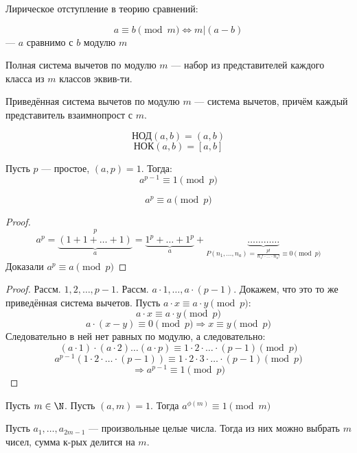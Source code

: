 Лирическое отступление в теорию сравнений:
\begin{definition}
\[
a \equiv b \pmod{m} \iff m | (a - b)
\]
--- $a$ сравнимо с $b$ модулю $m$
\end{definition}
\begin{definition}
Полная система вычетов по модулю $m$ --- набор из представителей каждого класса из $m$ классов эквив-ти.
\end{definition}
\begin{definition}
Приведённая система вычетов по модулю $m$ --- система вычетов, причём каждый представитель взаимнопрост с $m$.
\end{definition}
\begin{symb}
\[
\text{НОД}(a, b) = (a, b)
\]
\[
  \text{НОК}(a, b) = [a, b]
\]
\end{symb}
\begin{theorem}
\label{th:mlt_14}
Пусть $p$ --- простое, $(a, p) = 1$. Тогда:
\[
a^{p - 1} \equiv 1 \pmod p
\]
\end{theorem}
\begin{consequence}
\[
a^{p} \equiv a \pmod p
\]
\end{consequence}
\begin{proof}
\[
  a^{p} = \underbrace{(1 + 1 + \ldots + 1)}_{a}^{p} = \underbrace{1^{p} + \ldots + 1^{p}}_{a} + \underbrace{\ldots\ldots\ldots\ldots}_{P(n_1, \ldots, n_a) = \frac{p!}{n_1! \cdot \ldots \cdot n_a!} \equiv 0 \pmod p}
\]
Доказали $a^{p} \equiv a \pmod p$
\end{proof}
\begin{proof}
Рассм. $1, 2, \ldots, p - 1$. Рассм. $a \cdot 1, \ldots, a \cdot (p - 1)$. Докажем, что это то же приведённая система вычетов. Пусть $a \cdot x \equiv a \cdot y \pmod p$:
\[
a \cdot x \equiv a \cdot y \pmod p
\]
\[
  a \cdot (x - y) \equiv 0 \pmod p \Rightarrow x \equiv y \pmod p
\]
Следовательно в ней нет равных по модулю, а следовательно:
\[
  (a \cdot 1) \cdot (a \cdot 2) \ldots (a \cdot p) \equiv 1 \cdot 2 \cdot \ldots \cdot (p - 1) \pmod p
\]
\[
  a^{p - 1} (1 \cdot 2 \cdot \ldots \cdot (p - 1)) \equiv 1 \cdot 2 \cdot 3 \cdot \ldots \cdot (p - 1) \pmod p
\]
\[
\Rightarrow a^{p - 1} \equiv 1 \pmod p
\]
\end{proof}
\begin{theorem}[Эйлера]
\label{th:euler_14}
Пусть $m \in \N$. Пусть $(a, m) = 1$. Тогда $a^{\phi(m)} \equiv 1 \pmod m$
\end{theorem}
\begin{theorem}
\label{th:erdesh-ginsburg-ziva-14}
Пусть $a_1, \ldots, a_{2m - 1}$ --- произвольные целые числа. Тогда из них можно выбрать $m$ чисел, сумма к-рых делится на $m$.
\end{theorem}
